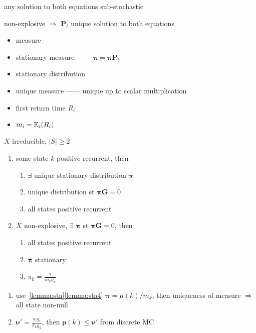 \begin{fact}
    any solution to both equations sub-stochastic
\end{fact}

\begin{fact}
    non-explosive $\Rightarrow$ $\bm P_t$ unique solution to both equations
\end{fact}

\begin{itemize}
    \item measure
    \item stationary measure ------ $\bm{\pi} = \bm\pi \bm P_t$
    \item stationary distribution
    \item unique measure ------ unique up to scalar multiplication
    \item first return time $R_{i}$
    \item $m_i = \mathbb{E}_i(R_i)$
\end{itemize}

\begin{thm}
    $X$ irreducible, $|S|\geq 2$
    \begin{enumerate}
        \item some state $k$ positive recurrent, then
        \begin{enumerate}
            \item $\exists$ unique stationary distribution $\bm \pi$
            \item unique distribution st $\bm \pi \bm G = 0$
            \item all states positive recurrent
        \end{enumerate}
        \item $X$ non-explosive, $\exists$ $\bm \pi$ st $\bm \pi \bm G = 0$, then
        \begin{enumerate}
            \item all states positive recurrent
            \item $\bm \pi$ stationary
            \item $\pi_k = \frac{1}{m_k g_k}$
        \end{enumerate}
    \end{enumerate}
\end{thm}
\begin{pf}
    \begin{enumerate}
        \item use~\ref{lemma:sta}\ref{lemma:sta4} $\bm \pi = \mu(k)/m_k$, then uniqueness of measure $\Rightarrow$ all state non-null
        \item $\bm \nu' = \frac{\pi_i g_i}{\pi_k g_k}$, then $\bm \rho(k) \leq \bm\nu'$ from discrete MC
    \end{enumerate}
\end{pf}


